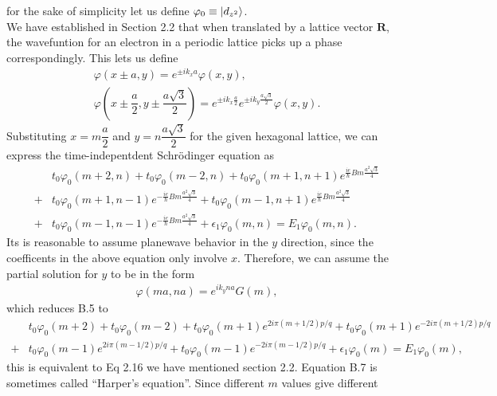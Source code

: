 \documentclass{report}
\newcommand{\f}[2]{\dfrac{#1}{#2}}
\begin{document}
for the sake of simplicity let us define $\varphi_{0} \equiv \ket{d_{z^{2}}}$.\\
We have established in Section 2.2 that when translated by a lattice vector $\mathbf{R}$, the wavefuntion for an electron in a periodic lattice picks up a phase correspondingly. This lets us define
\begin{gather}
	\varphi(x \pm a,y) = e^{\pm i k_{x} a} \varphi(x,y), \\ 
	\varphi(x \pm \f{a}{2},y \pm \f{a\sqrt{3}}{2}) = e^{\pm i k_{x} \frac{a}{2}} e^{\pm i k_{y} \frac{a\sqrt{3}}{2}} \varphi(x,y).
\end{gather}
Substituting $x = m \f{a}{2}$ and $y = n \f{a\sqrt{3}}{2}$ for the given hexagonal lattice, we can express the time-indepentdent Schr\"{o}dinger equation as 
\begin{equation}
	\begin{aligned}
		&t_{0} \varphi_{0}(m + 2, n) + t_{0} \varphi_{0}(m - 2, n) + t_{0} \varphi_{0}(m + 1, n + 1) e^{\frac{ie}{\hbar}Bm \frac{a^{2}\sqrt{3}}{4}} \\
		+& t_{0} \varphi_{0}(m + 1, n - 1) e^{-\frac{ie}{\hbar}Bm \frac{a^{2}\sqrt{3}}{4}} + t_{0} \varphi_{0}(m - 1, n + 1) e^{\frac{ie}{\hbar}Bm \frac{a^{2}\sqrt{3}}{4}} \\
		+& t_{0} \varphi_{0}(m - 1, n - 1) e^{-\frac{ie}{\hbar}Bm \frac{a^{2}\sqrt{3}}{4}} + \epsilon_{1} \varphi_{0}(m,n) = E_{1} \varphi_{0}(m,n).
	\end{aligned}
\end{equation}
Its is reasonable to assume planewave behavior in the $y$ direction, since the coefficents in the above equation only involve $x$. Therefore, we can assume the partial solution for $y$ to be in the form 
\begin{gather}
	\varphi(ma,na) = e^{i k_{y} n a} G(m),
\end{gather}
which reduces B.5 to
\begin{equation}
	\begin{aligned}
		&t_{0} \varphi_{0}(m + 2) + t_{0} \varphi_{0}(m - 2) + t_{0} \varphi_{0}(m + 1) e^{2 i \pi (m + 1 /2) p/ q} + t_{0} \varphi_{0}(m + 1) e^{-2 i \pi (m + 1 /2) p/ q}\\
		 +& t_{0} \varphi_{0}(m - 1) e^{2 i \pi (m - 1 /2) p/ q} 
		+ t_{0} \varphi_{0}(m - 1) e^{-2 i \pi (m - 1 /2) p/ q} + \epsilon_{1} \varphi_{0}(m) = E_{1} \varphi_{0}(m),
	\end{aligned}
\end{equation}
this is equivalent to Eq 2.16 we have mentioned section 2.2. Equation B.7 is sometimes called ``Harper's equation''. \cite{harper1955general} Since different $m$ values give different 
\end{document}
